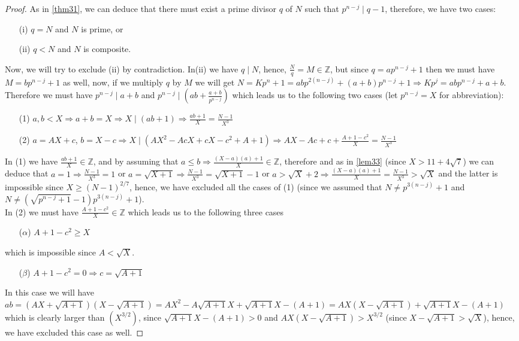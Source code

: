 \documentclass{amsart}
\numberwithin{equation}{section}
\begin{document}
\begin{proof}
	As in \ref{thm31}, we can deduce that there must exist a prime divisor $q$ of $N$ such that $p^{n-j} \mid q-1$, therefore, we have two cases:
	\begin{enumerate}
		\item[(i)] $q=N$ and $N$ is prime, or
		\item[(ii)] $q < N$ and $N$ is composite.
	\end{enumerate}
	Now, we will try to exclude (ii) by contradiction. In(ii) we have $q \mid N$, hence, $\frac{N}{q}=M \in \mathbb{Z}$, but since $q=ap^{n-j}+1$ then we must have $M=bp^{n-j}+1$ as well, now, if we multiply $q$ by $M$ we will get $N=Kp^n+1=abp^{2(n-j)}+(a+b)p^{n-j}+1 \Longrightarrow Kp^{j}=abp^{n-j}+a+b$. Therefore we must have $p^{n-j} \mid a+b$ and $p^{n-j} \mid (ab+\frac{a+b}{p^{n-j}})$ which leads us to the following two cases (let $p^{n-j}=X$ for abbreviation):
	\begin{enumerate}
		\item[(1)] $a,b <X \Longrightarrow a+b=X \Longrightarrow X \mid (ab+1) \Longrightarrow \frac{ab+1}{X}=\frac{N-1}{X^3}$
		\item[(2)] $a=AX+c$, $b=X-c \Longrightarrow  X \mid (AX^2 - AcX + cX -c^2 + A + 1) \Longrightarrow AX - Ac + c + \frac{A + 1 - c^2}{X}=\frac{N-1}{X^3}$
	\end{enumerate}
	In (1) we have $\frac{ab+1}{X} \in \mathbb{Z}$, and by assuming that $a \le b \Longrightarrow \frac{(X-a)(a)+1}{X} \in \mathbb{Z}$, therefore and as in \ref{lem33} (since $X > 11+4\sqrt{7}$) we can deduce that $a=1 \Longrightarrow \frac{N-1}{X^3}=1$ or $a=\sqrt{X+1} \Longrightarrow \frac{N-1}{X^3}=\sqrt{X+1}-1$ or $a > \sqrt{X}+2 \Longrightarrow \frac{(X-a)(a)+1}{X} = \frac{N-1}{X^3} > \sqrt{X}$ and the latter is impossible since $X \ge (N-1)^{2/7}$, hence, we have excluded all the cases of (1) (since we assumed that $N \neq p^{3(n-j)}+1$ and $N \neq (\sqrt{p^{n-j}+1}-1)p^{3(n-j)}+1$).
	\\
	In (2) we must have $\frac{A + 1 - c^2}{X} \in \mathbb{Z}$ which leads us to the following three cases
	\begin{enumerate}
		\item[($\alpha$)] $A + 1 - c^2 \ge X$
	\end{enumerate}
	which is impossible since $A < \sqrt{X}$.
	\begin{enumerate}
		\item[($\beta$)] $A+1-c^2=0 \Longrightarrow c = \sqrt{A+1}$
	\end{enumerate}
	In this case we will have $ab=(AX+\sqrt{A+1})(X-\sqrt{A+1})=AX^2-A \sqrt{A+1} X + \sqrt{A+1} X -(A+1)= AX(X-\sqrt{A+1}) + \sqrt{A+1}X-(A+1)$ which is clearly larger than $(X^{3/2})$, since $\sqrt{A+1}X-(A+1) > 0$ and $AX(X-\sqrt{A+1}) > X^{3/2}$ (since $ X-\sqrt{A+1} > \sqrt{X}$), hence, we have excluded this case as well.
	

\end{proof}
\end{document}
